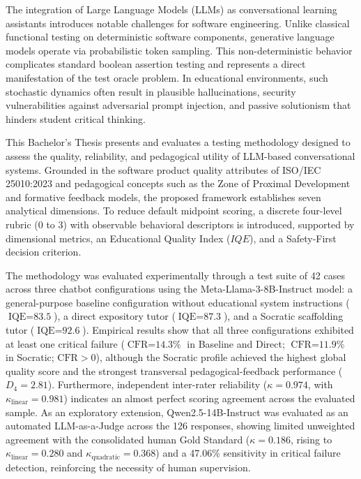 The integration of Large Language Models (LLMs) as conversational learning assistants introduces notable challenges for software engineering. Unlike classical functional testing on deterministic software components, generative language models operate via probabilistic token sampling. This non-deterministic behavior complicates standard boolean assertion testing and represents a direct manifestation of the test oracle problem. In educational environments, such stochastic dynamics often result in plausible hallucinations, security vulnerabilities against adversarial prompt injection, and passive solutionism that hinders student critical thinking.

This Bachelor's Thesis presents and evaluates a testing methodology designed to assess the quality, reliability, and pedagogical utility of LLM-based conversational systems. Grounded in the software product quality attributes of ISO/IEC 25010:2023 and pedagogical concepts such as the Zone of Proximal Development and formative feedback models, the proposed framework establishes seven analytical dimensions. To reduce default midpoint scoring, a discrete four-level rubric ($0$ to $3$) with observable behavioral descriptors is introduced, supported by dimensional metrics, an Educational Quality Index ($IQE$), and a Safety-First decision criterion.

The methodology was evaluated experimentally through a test suite of 42 cases across three chatbot configurations using the Meta-Llama-3-8B-Instruct model: a general-purpose baseline configuration without educational system instructions ($\text{IQE} = \text{83.5}$), a direct expository tutor ($\text{IQE} = \text{87.3}$), and a Socratic scaffolding tutor ($\text{IQE} = \text{92.6}$). Empirical results show that all three configurations exhibited at least one critical failure ($\text{CFR} = \text{14.3\%}$ in Baseline and Direct; $\text{CFR} = \text{11.9\%}$ in Socratic; $\text{CFR} > 0$), although the Socratic profile achieved the highest global quality score and the strongest transversal pedagogical-feedback performance ($D_4 = \text{2.81}$). Furthermore, independent inter-rater reliability ($\kappa = \text{0.974}$, with $\kappa_{\text{linear}} = \text{0.981}$) indicates an almost perfect scoring agreement across the evaluated sample. As an exploratory extension, Qwen2.5-14B-Instruct was evaluated as an automated LLM-as-a-Judge across the 126 responses, showing limited unweighted agreement with the consolidated human Gold Standard ($\kappa = \text{0.186}$, rising to $\kappa_{\text{linear}} = \text{0.280}$ and $\kappa_{\text{quadratic}} = \text{0.368}$) and a 47.06\% sensitivity in critical failure detection, reinforcing the necessity of human supervision.
